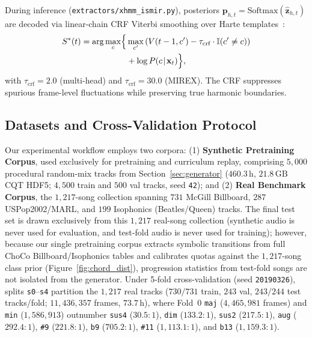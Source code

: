 During inference ({\small\texttt{extractors/xhmm\_ismir.py}}), posteriors $\mathbf{p}_{h,t} = \text{Softmax}(\hat{\mathbf{z}}_{h,t})$ are decoded via linear-chain CRF Viterbi smoothing over Harte templates~\cite{harte2005symbolic,akram2026chordformer}:
\begin{equation}\label{eq:viterbi_decoding}
  \begin{split}
    S^*(t) = \arg\max_{c} \Bigl\{ &\max_{c'} \left( V(t-1, c') - \tau_{\text{crf}} \cdot \mathbb{I}(c' \neq c) \right) \\
    &+ \log P(c \!\mid\! \mathbf{x}_t) \Bigr\},
  \end{split}
\end{equation}
with $\tau_{\text{crf}} = 2.0$ (multi-head) and $\tau_{\text{crf}} = 30.0$ (MIREX). The CRF suppresses spurious frame-level fluctuations while preserving true harmonic boundaries.



\subsection{Datasets and Cross-Validation Protocol}\label{subsec:datasets_splits}

Our experimental workflow employs two corpora: (1) \textbf{Synthetic Pretraining Corpus}, used exclusively for pretraining and curriculum replay, comprising $5{,}000$ procedural random-mix tracks from Section~\ref{sec:generator} ($460.3\,\text{h}$, $21.8\,\text{GB}$ CQT HDF5; $4{,}500$ train and $500$ val tracks, seed \texttt{42}); and (2) \textbf{Real Benchmark Corpus}, the $1{,}217$-song collection spanning $731$ McGill Billboard, $287$ USPop2002/MARL, and $199$ Isophonics (Beatles/Queen) tracks. The final test set is drawn exclusively from this $1{,}217$ real-song collection (synthetic audio is never used for evaluation, and test-fold audio is never used for training); however, because our single pretraining corpus extracts symbolic transitions from full ChoCo Billboard/Isophonics tables and calibrates quotas against the $1{,}217$-song class prior (Figure~\ref{fig:chord_dist}), progression statistics from test-fold songs are not isolated from the generator. Under 5-fold cross-validation (seed \texttt{20190326}), splits \texttt{s0}--\texttt{s4} partition the $1{,}217$ real tracks ($730/731$ train, $243$ val, $243/244$ test tracks/fold; $11{,}436{,}357$ frames, $73.7\,\text{h}$), where Fold~0 {\small\texttt{maj}} ($4{,}465{,}981$ frames) and {\small\texttt{min}} ($1{,}586{,}913$) outnumber {\small\texttt{sus4}} ($30.5\!:\!1$), {\small\texttt{dim}} ($133.2\!:\!1$), {\small\texttt{sus2}} ($217.5\!:\!1$), {\small\texttt{aug}} ($292.4\!:\!1$), {\small\texttt{\#9}} ($221.8\!:\!1$), {\small\texttt{b9}} ($705.2\!:\!1$), {\small\texttt{\#11}} ($1{,}113.1\!:\!1$), and {\small\texttt{b13}} ($1{,}159.3\!:\!1$).

